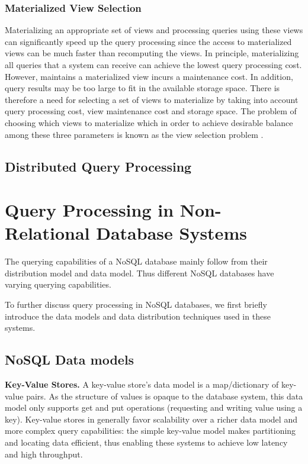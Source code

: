 \subsubsection{Materialized View Selection}

Materializing an appropriate set of views and processing queries using these views can significantly speed up the
query processing since the access to materialized views can be much faster than recomputing the views.
In principle, materializing all queries that a system can receive can achieve the lowest query processing cost.
However, maintains a materialized view incurs a maintenance cost.
In addition, query results may be too large to fit in the available storage space.
There is therefore a need for selecting a set of views to materialize by taking into account query processing cost,
view maintenance cost and storage space.
The problem of choosing which views to materialize which in order to achieve desirable balance among these three
parameters is known as the view selection problem \cite{gupta:viewselection, mami:viewselection}.

\subsection{Distributed Query Processing}


\section{Query Processing in Non-Relational Database Systems}

The querying capabilities of a NoSQL database mainly follow from their distribution model and data model.
Thus different NoSQL databases have varying querying capabilities.

To further discuss query processing in NoSQL databases, we first briefly introduce the data models and data distribution
techniques used in these systems.

\subsection{NoSQL Data models}
\noindent
\textbf{Key-Value Stores.} A key-value store's data model is a map/dictionary of key-value pairs.
As the structure of values is opaque to the database system, this data model only supports get and put operations
(requesting and writing value using a key).
Key-value stores in generally favor scalability over a richer data model and more complex query capabilities:
the simple key-value model makes partitioning and locating data efficient, thus enabling these systems to achieve low
latency and high throughput.

